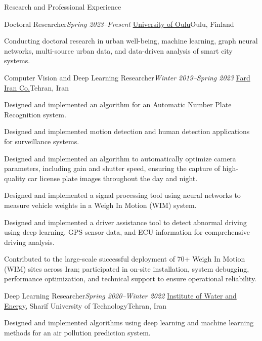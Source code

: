 \documentclass{resume}
\begin{document}
\begin{rSection}{Research and Professional Experience}
\vspace{+.1cm}

\begin{rSubsection}{Doctoral Researcher}{\em Spring 2023--Present}
{\href{https://www.oulu.fi/}{University of Oulu}}{Oulu, Finland}
    \item Conducting doctoral research in urban well-being, machine learning, graph neural networks, multi-source urban data, and data-driven analysis of smart city systems.
\end{rSubsection}

\begin{rSubsection}{Computer Vision and Deep Learning Researcher}{\em Winter 2019--Spring 2023}
{\href{https://en.towzin.com/}{Fard Iran Co.}}{Tehran, Iran}
    \item Designed and implemented an algorithm for an Automatic Number Plate Recognition system.
    \item Designed and implemented motion detection and human detection applications for surveillance systems.
    \item Designed and implemented an algorithm to automatically optimize camera parameters, including gain and shutter speed, ensuring the capture of high-quality car license plate images throughout the day and night.
    \item Designed and implemented a signal processing tool using neural networks to measure vehicle weights in a Weigh In Motion (WIM) system.
    \item Designed and implemented a driver assistance tool to detect abnormal driving using deep learning, GPS sensor data, and ECU information for comprehensive driving analysis.
    \item Contributed to the large-scale successful deployment of 70+ Weigh In Motion (WIM) sites across Iran; participated in on-site installation, system debugging, performance optimization, and technical support to ensure operational reliability.
\end{rSubsection}

\begin{rSubsection}{Deep Learning Researcher}{\em Spring 2020--Winter 2022}
{\href{http://iwe.sharif.edu/}{Institute of Water and Energy}, Sharif University of Technology}{Tehran, Iran}
    \item Designed and implemented algorithms using deep learning and machine learning methods for an air pollution prediction system.
\end{rSubsection}

\end{rSection}
\end{document}
